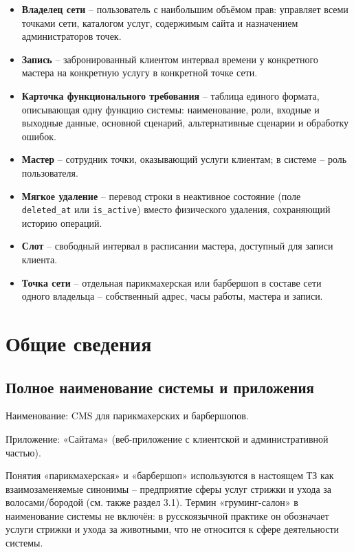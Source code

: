 \begin{itemize}[leftmargin=0pt, itemindent=1.5cm, labelsep=0pt, label={}]
\item \textbf{Владелец сети} -- пользователь с наибольшим объёмом прав: управляет всеми точками сети, каталогом услуг, содержимым сайта и назначением администраторов точек.
\item \textbf{Запись} -- забронированный клиентом интервал времени у конкретного мастера на конкретную услугу в конкретной точке сети.
\item \textbf{Карточка функционального требования} -- таблица единого формата, описывающая одну функцию системы: наименование, роли, входные и выходные данные, основной сценарий, альтернативные сценарии и обработку ошибок.
\item \textbf{Мастер} -- сотрудник точки, оказывающий услуги клиентам; в системе -- роль пользователя.
\item \textbf{Мягкое удаление} -- перевод строки в неактивное состояние (поле \texttt{deleted\_at} или \texttt{is\_active}) вместо физического удаления, сохраняющий историю операций.
\item \textbf{Слот} -- свободный интервал в расписании мастера, доступный для записи клиента.
\item \textbf{Точка сети} -- отдельная парикмахерская или барбершоп в составе сети одного владельца -- собственный адрес, часы работы, мастера и записи.
\end{itemize}

\section{Общие сведения}

\subsection{Полное наименование системы и приложения}

Наименование: CMS для парикмахерских и барбершопов.

Приложение: «Сайтама» (веб-приложение с клиентской и административной частью).

Понятия «парикмахерская» и «барбершоп» используются в настоящем ТЗ как взаимозаменяемые синонимы -- предприятие сферы услуг стрижки и ухода за волосами/бородой (см. также раздел 3.1). Термин «груминг-салон» в наименование системы не включён: в русскоязычной практике он обозначает услуги стрижки и ухода за животными, что не относится к сфере деятельности системы.

